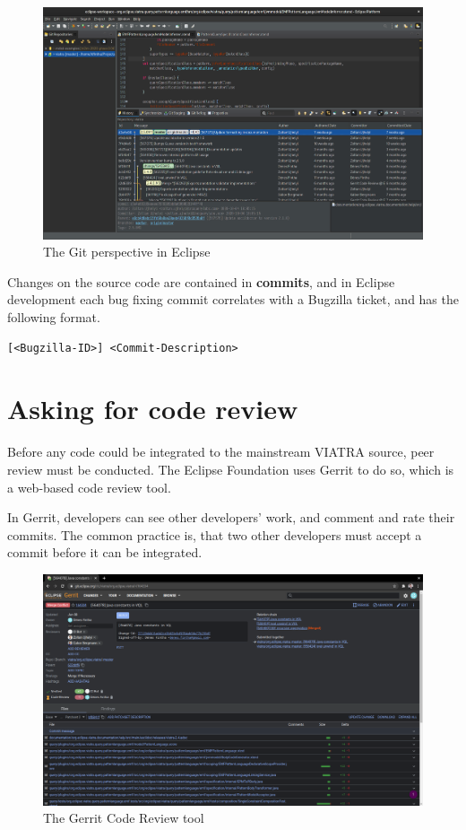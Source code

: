 \documentclass[11pt,a4paper,oneside]{report}
\begin{document}
\begin{figure}[ht]
\centering
\includegraphics[width=150mm, keepaspectratio]{figures/eclipse-git.png}
\caption{The Git perspective in Eclipse}
\label{fig:eclipse-git}
\end{figure}

Changes on the source code are contained in \textbf{commits}, and in Eclipse
development each bug fixing commit correlates with a Bugzilla ticket, and has
the following format.

\begin{lstlisting}
[<Bugzilla-ID>] <Commit-Description>
\end{lstlisting}

\section{Asking for code review}
Before any code could be integrated to the mainstream VIATRA source, peer review
must be conducted. The Eclipse Foundation uses Gerrit to do so, which is a
web-based code review tool.

In Gerrit, developers can see other developers' work, and comment and rate their
commits. The common practice is, that two other developers must accept a
commit before it can be integrated.

\begin{figure}[ht]
\centering
\includegraphics[width=150mm, keepaspectratio]{figures/gerrit.png}
\caption{The Gerrit Code Review tool}
\label{fig:gerrit}
\end{figure}
\end{document}
